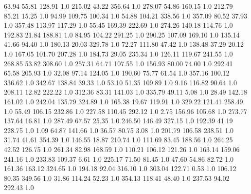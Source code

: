      63.94     55.81    128.91  1.0
    215.02     43.22    356.64  1.0
    278.07     54.86    160.15  1.0
    212.79     85.21     15.25  1.0
     94.99    109.75    100.34  1.0
     54.88    104.21    338.56  1.0
    357.09     80.52     37.93  1.0
    357.48    113.97    117.29  1.0
     55.45    169.39    222.69  1.0
    274.26    140.18    114.76  1.0
    192.83     21.84    188.81  1.0
     84.95    104.22    291.25  1.0
    290.25    107.09    169.10  1.0
    135.14     41.66     94.40  1.0
    180.13     20.03    329.78  1.0
     72.27    111.80     47.42  1.0
    138.48     37.29     20.12  1.0
    167.05    101.70    207.28  1.0
    184.73     29.05    235.34  1.0
    126.11    119.67    241.55  1.0
    268.85     53.82    308.60  1.0
    257.31     64.71    107.55  1.0
    156.93     80.00     74.00  1.0
    292.41     65.58    205.93  1.0
     32.08     97.14    124.05  1.0
    190.60     75.77     61.54  1.0
    357.16    100.12    336.62  1.0
    342.67    138.84     39.33  1.0
     53.10     51.35    109.89  1.0
      9.16    116.82     90.64  1.0
    208.11     12.82    222.22  1.0
    312.36     83.31    141.03  1.0
    335.79     49.11      5.08  1.0
     28.49    142.18    161.02  1.0
    242.04    135.79    324.89  1.0
    165.38     19.67    119.91  1.0
    329.22    121.41    258.49  1.0
     55.49    106.15    232.86  1.0
    227.58    110.45    292.12  1.0
      2.75    156.96    105.68  1.0
    273.77    137.64     16.81  1.0
    287.49     67.57     25.35  1.0
    246.50    146.49    327.15  1.0
    192.39     41.19    228.75  1.0
      1.09     64.87    141.66  1.0
     36.57     80.75      3.08  1.0
    201.79    106.58    238.51  1.0
     31.74     41.61    354.39  1.0
    146.55     18.87    210.74  1.0
    111.69     83.45    188.56  1.0
    264.25     42.52    126.75  1.0
    261.34     82.98    168.59  1.0
    110.21    106.12    121.26  1.0
    163.14    159.06    241.16  1.0
    233.83    109.37      6.61  1.0
    225.17     71.50     81.45  1.0
     47.60     54.86     82.72  1.0
    161.36    163.12    324.65  1.0
    194.18     92.04    316.10  1.0
    303.04    122.71      0.53  1.0
    106.12     80.35    349.56  1.0
     31.86    114.24     52.23  1.0
    354.13    118.41     48.40  1.0
    237.53     94.02    292.43  1.0